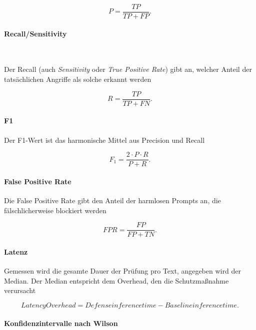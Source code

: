 \begin{equation}
  P = \frac{TP}{TP + FP} .
\end{equation}

\paragraph{Recall/Sensitivity}~\cite[227]{sm29}

Der Recall (auch \textit{Sensitivity} oder \textit{True Positive Rate}) gibt an, welcher Anteil der tatsächlichen Angriffe als solche erkannt werden

\begin{equation}
  R = \frac{TP}{TP + FN} .
\end{equation}

\paragraph{F1~\cite[227]{sm29}}

Der F1-Wert ist das harmonische Mittel aus Precision und Recall

\begin{equation}
  F_1 = \frac{2 \cdot P \cdot R}{P + R} .
\end{equation}

\paragraph{False Positive Rate~\cite[22]{sm27}}

Die False Positive Rate gibt den Anteil der harmlosen Prompts an, die fälschlicherweise blockiert werden

\begin{equation}
  \mathit{FPR} = \frac{FP}{FP + TN} .
\end{equation}

\paragraph{Latenz~\cite[22]{sm27}}

Gemessen wird die gesamte Dauer der Prüfung pro Text, angegeben wird der Median. Der Median entspricht dem Overhead, den die Schutzmaßnahme verursacht

\begin{equation}
  \mathit{Latency Overhead} = \mathit{Defense inference time} - \mathit{Baseline inference time} .
\end{equation}

\paragraph{Konfidenzintervalle nach Wilson~\cite{sm44}}

